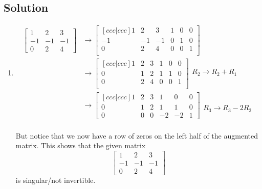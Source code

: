 \documentclass[11pt]{article}
\begin{document}
\subsection{Solution}
\begin{enumerate}[ (a) ]
\item 
\begin{align*}
\begin{bmatrix}
1 & 2 & 3\\
-1 & -1 & -1\\
0 & 2 & 4
\end{bmatrix}
&\rightarrow
\begin{bmatrix}[ccc|ccc]
1 & 2 & 3 & 1 & 0 & 0\\
-1 & -1 & -1 & 0 & 1 & 0\\
0 & 2 & 4 & 0 & 0 & 1\\
\end{bmatrix} \\
&\rightarrow
\begin{bmatrix}[ccc|ccc]
1 & 2 & 3 & 1 & 0 & 0\\
0 & 1 & 2 & 1 & 1 & 0\\
0 & 2 & 4 & 0 & 0 & 1\\
\end{bmatrix} 
\begin{matrix}
\\
R_2 \rightarrow R_2 + R_1 \\
\\
\end{matrix} \\
&\rightarrow
\begin{bmatrix}[ccc|ccc]
1 & 2 & 3 & 1 & 0 & 0\\
0 & 1 & 2 & 1 & 1 & 0\\
0 & 0 & 0 & -2 & -2 & 1
\end{bmatrix}
\begin{matrix}
\\
\\
R_3 \rightarrow R_3 - 2R_2
\end{matrix} \\
\end{align*}

But notice that we now have a row of zeros on the left half of the augmented matrix. This shows that the given matrix
\[
\begin{bmatrix}
1 & 2 & 3\\
-1 & -1 & -1\\
0 & 2 & 4
\end{bmatrix}
\]
is singular/not invertible.


\end{enumerate}
\end{document}
